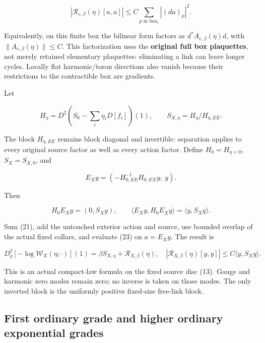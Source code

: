 \documentclass[
  11pt,
]{article}
\begin{document}
\[
 |\mathcal R_{e,\beta}(\eta)[a,a]|
 \le C\sum_{p\text{ in box}_e}|(da)_p|^2.        \tag{23}
\]

Equivalently, on this finite box the bilinear form factors as
\(d^*A_{e,\beta}(\eta)d\), with \(\|A_{e,\beta}(\eta)\|\le C\). This
factorization uses the \textbf{original full box plaquettes}, not merely
retained elementary plaquettes: eliminating a link can leave longer
cycles. Locally flat harmonic/toron directions also vanish because their
restrictions to the contractible box are gradients.

Let

\[
 H_\eta=D^2\left(S_0-\sum_i\eta_iD[f_i]\right)(1),
 \qquad S_{X,\eta}=H_\eta/H_{\eta,EE}.
                                                        \tag{24}
\]

The block \(H_{\eta,EE}\) remains block diagonal and invertible:
separation applies to every original source factor as well as every
action factor. Define \(H_0=H_{\eta=0}\), \(S_X=S_{X,0}\), and

\[
 E_Xy=(-H_{0,EE}^{-1}H_{0,EX}y,\ y).
                                                        \tag{25}
\]

Then

\[
 H_0E_Xy=(0,S_Xy),
 \qquad
 \langle E_Xy,H_0E_Xy\rangle=\langle y,S_Xy\rangle.
                                                        \tag{26}
\]

Sum (21), add the untouched exterior action and source, use bounded
overlap of the actual fixed collars, and evaluate (23) on \(a=E_Xy\).
The result is

\[
 \boxed{
 D_y^2[-\log\mathcal W_X(\eta;\cdot)](1)
 =\beta S_{X,\eta}+\mathcal R_{X,\beta}(\eta),
 \quad
 |\mathcal R_{X,\beta}(\eta)[y,y]|
 \le C\langle y,S_Xy\rangle.}
                                                        \tag{27}
\]

This is an actual compact-law formula on the fixed source disc (13).
Gauge and harmonic zero modes remain zero; no inverse is taken on those
modes. The only inverted block is the uniformly positive fixed-size
free-link block.

\hypertarget{first-ordinary-grade-and-higher-ordinary-exponential-grades}{%
\subsection{First ordinary grade and higher ordinary exponential
grades}\label{first-ordinary-grade-and-higher-ordinary-exponential-grades}}
\end{document}
